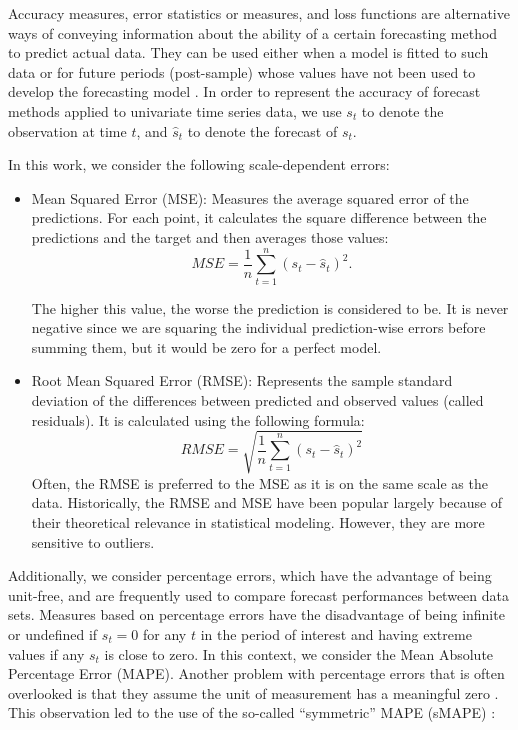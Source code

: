 Accuracy measures, error statistics or measures, and loss functions are alternative ways of conveying information about the ability of a certain forecasting method to predict actual data. They can be used either when a model is fitted to such data or for future periods (post-sample) whose values have not been used to develop the forecasting model \cite{Makridakis1993}. In order to represent the accuracy of forecast methods applied to univariate time series data, we use $s_{t}$ to denote the observation at time $t$, and $\hat{s}_t$ to denote the forecast of $s_{t}$.

In this work, we consider the following scale-dependent errors:
\begin{itemize}
	\item Mean Squared Error (MSE): Measures the average squared error of the predictions. For each point, it calculates the square difference between the predictions and the target and then averages those values:
	\begin{equation}
	MSE = \frac{1}{n} \sum_{t=1}^{n} \left(s_t-\hat{s}_t\right)^{2}.
	\end{equation}
	
	The higher this value, the worse the prediction is considered to be. It is never negative since we are squaring the individual prediction-wise errors before summing them, but it would be zero for a perfect model.
	
	\item Root Mean Squared Error (RMSE): Represents the sample standard deviation of the differences between predicted and observed values (called residuals). It is calculated using the following formula:
	\begin{equation}
	RMSE = \sqrt{\frac{1}{n} \sum_{t=1}^{n} \left(s_t-\hat{s}_t\right)^2}
	\end{equation}
	Often, the RMSE is preferred to the MSE as it is on the same scale as the data. Historically, the RMSE and MSE have been popular largely because of their theoretical relevance in statistical modeling. However, they are more sensitive to outliers.
\end{itemize}

Additionally, we consider percentage errors, which have the advantage of being unit-free, and are frequently used to compare forecast performances between data sets. Measures based on percentage errors have the disadvantage of being infinite or undefined if $s_{t}=0$ for any $t$ in the period of interest and having extreme values if any $s_{t}$ is close to zero. In this context, we consider the Mean Absolute Percentage Error (MAPE). Another problem with percentage errors that is often overlooked is that they assume the unit of measurement has a meaningful zero \cite{Hyndman2006}. This observation led to the use of the so-called ``symmetric'' MAPE (sMAPE) \cite{Makridakis1993}:

